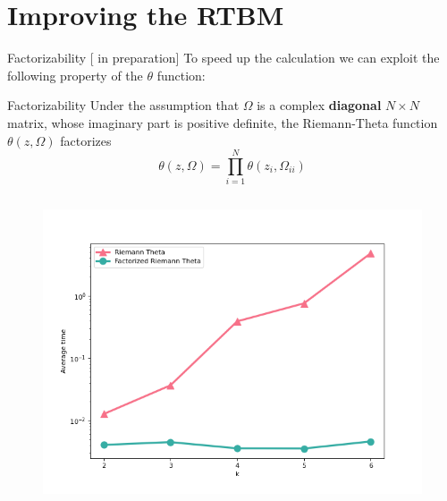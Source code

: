 \documentclass[10pt]{beamer}
\begin{document}
\section{Improving the RTBM}


\begin{frame}{Factorizability \hfill \small [\cite{new} in preparation]}
    To speed up the calculation we can exploit the following property of the $\theta$ function:
    \begin{block}{Factorizability}
        Under the assumption that $\Omega$ is a complex \textbf{diagonal} $N \times N$
        matrix, whose imaginary part is positive definite, the Riemann-Theta function
        $\theta(z, \Omega)$ factorizes
        \begin{equation}
            \label{eq:theta}
            \theta(z, \Omega) = \prod_{i=1}^N \theta(z_i, \Omega_{ii})
        \end{equation}
        \end{block}

    \vspace{-1.3    cm}
    \begin{columns}
        \begin{column}{0.7 \textwidth}
            \vspace{1cm}

            \begin{figure}
                \begin{center}
                    \includegraphics[scale=0.4]{figures/factorized.png}
                \end{center}
                \vspace{-0.8cm}


\end{figure}
\end{column}
\end{columns}
\end{frame}
\end{document}
